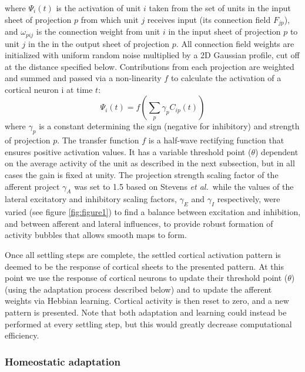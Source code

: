 \documentclass[utf8]{frontiersSCNS}
\newcommand{\etal}{\textit{et al.}}
\begin{document}
\noindent where $\Psi_{i}(t)$ is the activation of unit $i$ taken from the set of units in the input
sheet of projection $p$ from which unit $j$ receives input (its connection field $F_{jp}$), and $\omega_{pij}$ is the connection
weight from unit $i$ in the input sheet of projection $p$ to unit $j$ in the in the output sheet of projection $p$. All connection field
weights are initialized with uniform random noise multiplied by a 2D Gaussian profile, cut off at the distance specified below.
Contributions from each projection are weighted and summed and passed via a non-linearity $f$ to calculate the activation of a cortical neuron i at time $t$:
\begin{equation} \label{eq:neural_model}
\Psi_{i}(t)= f(\sum_{p}\gamma_{p}C_{ip}(t))
\end{equation}
\noindent where $\gamma_{p}$ is a constant determining the sign (negative for inhibitory) and strength of projection $p$. 
The transfer function $f$ is a half-wave rectifying function that ensures positive activation values. It has a 
variable threshold point ($\theta$) dependent on the average activity of the unit as described in the next subsection, 
but in all cases the gain is fixed at unity. The projection strength scaling factor of the afferent project $\gamma_{A}$ was set to 1.5 
based on Stevens \etal\,\citep{Stevens2013} while the values of the lateral excitatory  and inhibitory scaling factors, $\gamma_{E}$
and $\gamma_{I}$ respectively, were varied (see figure \ref{fig:figure1}) to find a balance between excitation and inhibition, and between afferent and lateral influences, to provide robust formation of activity bubbles that allows smooth maps to form.

Once all  settling steps are complete, the settled cortical activation pattern is deemed to be the response of cortical sheets to 
the presented pattern. At this point we use the response of cortical neurons to update their threshold point ($\theta$) (using the adaptation process described below) and to update the afferent weights via Hebbian learning. Cortical activity is then reset to zero, and a new pattern is presented. Note that both adaptation and learning could instead be performed at every settling step, but this would greatly decrease computational efficiency.

\subsubsection{Homeostatic adaptation}
\end{document}
